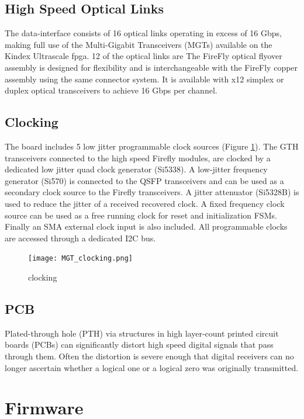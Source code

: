 \documentclass[a4paper]{PoS}
\begin{document}
\subsection{High Speed Optical Links}
The data-interface consists of 16 optical links operating in excess of 16 Gbps, making full use of the Multi-Gigabit Transceivers (MGTs) available on the Kindex Ultrascale fpga. 12 of the optical links are  
The FireFly optical flyover assembly is designed for flexibility and is interchangeable with the FireFly copper assembly using the same connector system. It is available with x12 simplex or duplex optical transceivers to achieve 16 Gbps per channel.


\subsection{Clocking}
The board includes 5 low jitter programmable clock sources (Figure \ref{clocking}). The GTH transceivers connected to the high speed Firefly modules, are clocked by a dedicated low jitter quad clock generator (Si5338). A low-jitter frequency generator (Si570) is connected to the QSFP transceivers and can be used as a secondary clock source to the Firefly transceivers. A jitter attenuator (Si5328B) is used to reduce the jitter of a received recovered clock. A fixed frequency clock source can be used as a free running clock for reset and initialization FSMs. Finally an SMA external clock input is also included. All programmable clocks are accessed through a dedicated I2C bus.

\begin{figure}[h]
\centering
\texttt{[image: MGT\_clocking.png]}
\caption{clocking}
\label{clocking}
\end{figure}


\subsection{PCB}
Plated-through hole (PTH) via structures in high layer-count printed circuit boards (PCBs) can significantly distort high speed digital signals that pass through them. Often the  distortion is severe enough that digital receivers can no longer ascertain whether a  logical one or a logical zero was originally transmitted. 


\section{Firmware}
\end{document}
